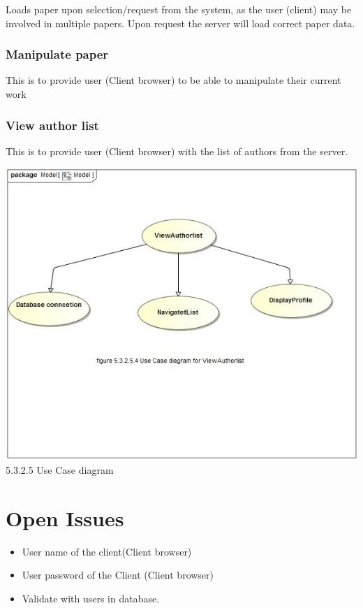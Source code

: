 \documentclass[hidelinks,a4paper,12pt]{article}
\begin{document}
		Loads paper upon selection/request from the system, as the user (client)  
		may be involved in multiple papers. Upon request the server will load 
		correct paper data. 
		
		
		\subsubsection{Manipulate paper} 
		
		This is to provide user (Client browser) to be able to manipulate their current work  	
		
		\subsubsection{View author list}
		
		This is to provide user (Client browser) with the list of authors from the server.
		
		\includegraphics[width=1\textwidth]{./Graphs/UseCasediagramforViewAuthorList.JPG}\\[0.4cm]
		
		
		5.3.2.5 Use Case diagram
	
	
	\section{Open Issues}
	\begin{itemize}
		\item User name of the client(Client browser)
		\item User password of the Client (Client browser)
		\item Validate with users in database. 
	\end{itemize}
	
	
	
	
\end{document}
